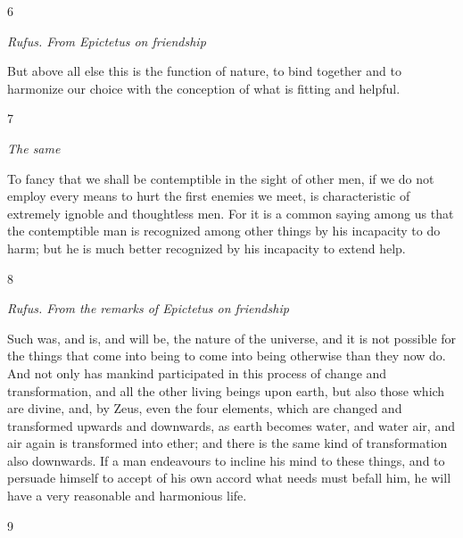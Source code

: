 6

\emph{Rufus. From Epictetus on friendship}

But above all else this is the function of nature, to bind together and to harmonize our choice with the conception of what is fitting and helpful.

7

\emph{The same}

To fancy that we shall be contemptible in the sight of other men, if we do not employ every means to hurt the first enemies we meet, is characteristic of extremely ignoble and thoughtless men. For it is a common saying among us that the contemptible man is recognized among other things by his incapacity to do harm; but he is much better recognized by his incapacity to extend help.

8

\emph{Rufus. From the remarks of Epictetus on friendship}

Such was, and is, and will be, the nature of the universe, and it is not possible for the things that come into being to come into being otherwise than they now do. And not only has mankind participated in this process of change and transformation, and all the other living beings upon earth, but also those which are divine, and, by Zeus, even the four elements, which are changed and transformed upwards and downwards, as earth becomes water, and water air, and air again is transformed into ether; and there is the same kind of transformation also downwards. If a man endeavours to incline his mind to these things, and to persuade himself to accept of his own accord what needs must befall him, he will have a very reasonable and harmonious life.

9


